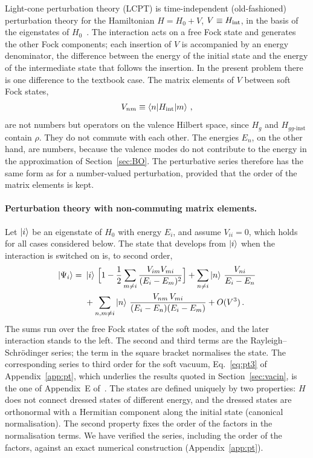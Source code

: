 Light-cone perturbation theory (LCPT) is time-independent (old-fashioned) perturbation theory for the Hamiltonian $H=H_0+V$, $V\equiv H_{\rm int}$, in the basis of the eigenstates of $H_0$~\cite{Lepage:1980fj,Brodsky:1997de}. The interaction acts on a free Fock state and generates the other Fock components; each insertion of $V$ is accompanied by an energy denominator, the difference between the energy of the initial state and the energy of the intermediate state that follows the insertion. In the present problem there is one difference to the textbook case. The matrix elements of $V$ between soft Fock states,
\begin{align}
V_{nm}\equiv\braket{n|H_{\rm int}|m}\,,
\end{align}
are not numbers but operators on the valence Hilbert space, since $H_g$ and $H_{gg\text{-inst}}$ contain $\rho$. They do not commute with each other. The energies $E_n$, on the other hand, are numbers, because the valence modes do not contribute to the energy in the approximation of Section~\ref{sec:BO}. The perturbative series therefore has the same form as for a number-valued perturbation, provided that the order of the matrix elements is kept.

\paragraph{Perturbation theory with non-commuting matrix elements.} Let $\ket i$ be an eigenstate of $H_0$ with energy $E_i$, and assume $V_{ii}=0$, which holds for all cases considered below. The state that develops from $\ket i$ when the interaction is switched on is, to second order,
\begin{align}\label{eq:pt2}
\ket{\Psi_i}=\ &\ket i\,\Big[1-\frac12\sum_{m\neq i}\frac{V_{im}V_{mi}}{(E_i-E_m)^2}\Big]
+\sum_{n\neq i}\ket n\,\frac{V_{ni}}{E_i-E_n}\notag\\
&+\sum_{n,m\neq i}\ket n\,\frac{V_{nm}\,V_{mi}}{(E_i-E_n)(E_i-E_m)}+O(V^3)\,.
\end{align}
The sums run over the free Fock states of the soft modes, and the later interaction stands to the left. The second and third terms are the Rayleigh--Schr\"odinger series; the term in the square bracket normalises the state. The corresponding series to third order for the soft vacuum, Eq.~\eqref{eq:pt3} of Appendix~\ref{app:pt}, which underlies the results quoted in Section~\ref{sec:vacin}, is the one of Appendix~E of~\cite{Lublinsky:2016meo}. The states are defined uniquely by two properties: $H$ does not connect dressed states of different energy, and the dressed states are orthonormal with a Hermitian component along the initial state (canonical normalisation). The second property fixes the order of the factors in the normalisation terms. We have verified the series, including the order of the factors, against an exact numerical construction (Appendix~\ref{app:pt}).

